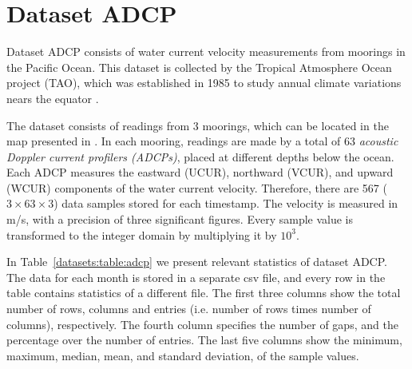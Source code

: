 
\vspace{-15pt}
\section{Dataset ADCP}
\label{datasets:adcp}


Dataset ADCP \cite{dataset:sst1} consists of water current velocity measurements from moorings in the Pacific Ocean. This dataset is collected by the Tropical Atmosphere Ocean project (TAO), which was established in 1985 to study annual climate variations nears the equator \cite{dataset:tao}.


The dataset consists of readings from 3 moorings, which can be located in the map presented in \cite{dataset:sst1}. In each mooring, readings are made by a total of 63 \textit{acoustic Doppler current profilers (ADCPs)}, placed at different depths below the ocean. Each ADCP measures the eastward (UCUR), northward (VCUR), and upward (WCUR) components of the water current velocity. Therefore, there are 567 ($3\times63\times3$) data samples stored for each timestamp. The velocity is measured in m/s, with a precision of three significant figures. Every sample value is transformed to the integer domain by multiplying it by $10^3$.


In Table~\ref{datasets:table:adcp} we present relevant statistics of dataset ADCP. The data for each month is stored in a separate csv file, and every row in the table contains statistics of a different file. The first three columns show the total number of rows, columns and entries (i.e. number of rows times number of columns), respectively. The fourth column specifies the number of gaps, and the percentage over the number of entries. The last five columns show the minimum, maximum, median, mean, and standard deviation, of the sample values.





